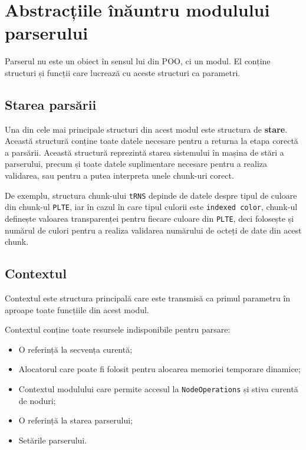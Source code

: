 \documentclass[a4paper,12pt]{report}
\begin{document}
\section{Abstracțiile înăuntru modulului parserului}

Parserul nu este un obiect în sensul lui din \ac{POO}, ci un modul.
El conține structuri și funcții care lucrează cu aceste structuri ca parametri.

\subsection{Starea parsării}

Una din cele mai principale structuri din acest modul este structura de \textbf{stare}.
Această structură conține toate datele necesare pentru a returna la etapa corectă a parsării.
Această structură reprezintă starea sistemului în mașina de stări a parserului,
precum și toate datele suplimentare necesare pentru a realiza validarea,
sau pentru a putea interpreta unele chunk-uri corect.

De exemplu, structura chunk-ului \texttt{tRNS} depinde de datele despre
tipul de culoare din chunk-ul \texttt{PLTE}, iar în cazul în care tipul culorii este \texttt{indexed color},
chunk-ul definește valoarea transparenței pentru fiecare culoare din \texttt{PLTE},
deci folosește și numărul de culori pentru a realiza validarea numărului de octeți de date din acest chunk.

\subsection{Contextul}

Contextul este structura principală care este transmisă ca primul parametru
în aproape toate funcțiile din acest modul.

Contextul conține toate resursele indisponibile pentru parsare:
\begin{itemize}
    \item O referință la secvența curentă;
    \item Alocatorul care poate fi folosit pentru alocarea memoriei temporare dinamice;
    \item Contextul modulului care permite accesul la \texttt{NodeOperations} și stiva curentă de noduri;
    \item O referință la starea parserului;
    \item Setările parserului.
\end{itemize}
\end{document}
